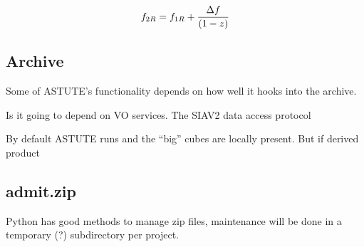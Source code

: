 \documentclass[preprint]{aastex} %
\begin{document}
$$
 f_{2R} = f_{1R} + {  {\Delta f} \over { (1-z) }}
$$


\subsection{Archive}

Some of ASTUTE's functionality depends on how well it hooks into the archive.

Is it going to depend on VO services. The SIAV2 data access protocol

By default ASTUTE runs and the ``big'' cubes are locally present. But if derived
product

\subsection{admit.zip}

Python has good methods to manage zip files, maintenance will be done in 
a temporary (?) subdirectory per project.
\end{document}
